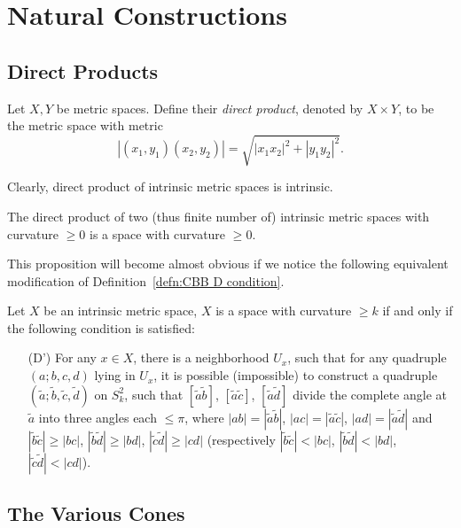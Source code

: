 \section{Natural Constructions}

\subsection{Direct Products}

\begin{defn}
    Let $X,Y$ be metric spaces.
    Define their \emph{direct product}, denoted by $X\times Y$, to be the metric space with metric
    \[|(x_1,y_1)(x_2,y_2)|=\sqrt{|x_1x_2|^2+|y_1y_2|^2}.\]
\end{defn}

Clearly, direct product of intrinsic metric spaces is intrinsic.

\begin{prop}
    The direct product of two (thus finite number of) intrinsic metric spaces with curvature $\geq 0$ is a space with curvature $\geq 0$.
\end{prop}

This proposition will become almost obvious if we notice the following equivalent modification of Definition~\ref{defn:CBB D condition}.

\begin{lem}
    Let $X$ be an intrinsic metric space, $X$ is a space with curvature $\geq k$ if and only if the following condition is satisfied:
    \begin{itemize}
        \item[\rm (D')] For any $x\in X$, there is a neighborhood $U_x$, such that for any quadruple $(a;b,c,d)$ lying in $U_x$, it is possible (impossible) to construct a quadruple $(\tilde{a};\tilde{b},\tilde{c},\tilde{d})$ on $S^2_k$, such that $[\tilde{a}\tilde{b}]$, $[\tilde{a}\tilde{c}]$, $[\tilde{a}\tilde{d}]$ divide the complete angle at $\tilde{a}$ into three angles each $\leq\pi$, where $|ab|=|\tilde{a}\tilde{b}|$, $|ac|=|\tilde{a}\tilde{c}|$, $|ad|=|\tilde{a}\tilde{d}|$ and $|\tilde{b}\tilde{c}|\geq|bc|$, $|\tilde{b}\tilde{d}|\geq|bd|$, $|\tilde{c}\tilde{d}|\geq|cd|$ (respectively $|\tilde{b}\tilde{c}|<|bc|$, $|\tilde{b}\tilde{d}|<|bd|$, $|\tilde{c}\tilde{d}|<|cd|$).
    \end{itemize}
\end{lem}

\subsection{The Various Cones}

